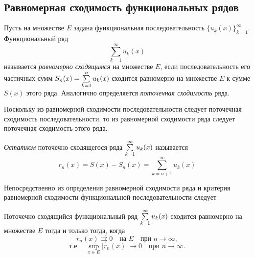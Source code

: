 \subsection{Равномерная сходимость функциональных рядов}

\begin{defn}
	Пусть на множестве $E$ задана функциональная последовательность $\{u_k(x)\}_{k=1}^\infty$.
	Функциональный ряд
	\begin{equation}
		\label{ch12:p2:eq:fun_series}
		\sum_{k=1}^{\infty} u_k(x)
	\end{equation}
	называется \textit{равномерно сходящимся} на множестве $E$, если последовательность его
	частичных сумм $S_n(x) = \sum_{k=1}^{n}\limits u_k(x)$ сходится равномерно на множестве $E$
	к сумме $S(x)$ этого ряда. Аналогично определяется \textit{поточечная сходимость} ряда.
\end{defn}

Поскольку из равномерной сходимости последовательности следует поточечная сходимость последовательности,
то из равномерной сходимости ряда следует поточечная сходимость этого ряда.

\begin{defn}
	\textit{Остатком} поточечно сходящегося ряда $\sum_{k=1}^{\infty}\limits u_k(x)$ называется
	$$
		r_n(x) = S(x) - S_n(x) = \sum_{k=n+1}^{\infty} u_k(x)
	$$
\end{defn}

Непосредственно из определения равномерной сходимости ряда и критерия равномерной сходимости
функциональной последовательности следует

\begin{thm}
	\label{ch12:th:ce_series_criteria}
	Поточечно сходящийся функциональный ряд $\sum_{k=1}^{\infty}\limits u_k(x)$ сходится
	равномерно на множестве $E$ тогда и только тогда, когда
	$$
		r_n(x) \rightrightarrows 0 \quad \text{на } E \quad \text{при } n \to \infty,
	$$
	$$
		\text{т.е.} \quad \sup_{x \in E} |r_n(x)| \to 0 \quad \text{при } n \to \infty.
	$$
\end{thm}


